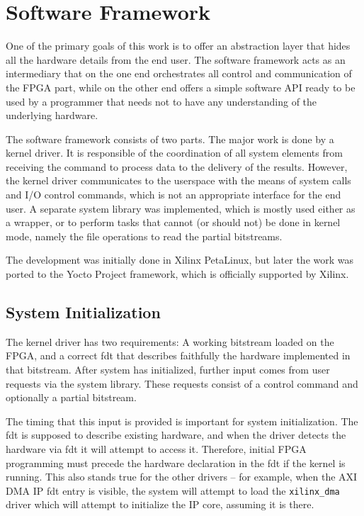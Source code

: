 \chapter{Software Framework}

One of the primary goals of this work is to offer an abstraction layer that hides
all the hardware details from the end user. The software framework acts as an intermediary
that on the one end orchestrates all control and communication of the FPGA part, while
on the other end offers a simple software API ready to be used by a programmer that needs not
to have any understanding of the underlying hardware.

The software framework consists of two parts. The major work is done by a kernel driver.
It is responsible of the coordination of all system elements from receiving the command
to process data to the delivery of the results. However, the kernel driver communicates
to the userspace with the means of system calls and I/O control commands, which is not
an appropriate interface for the end user. A separate system library was implemented,
which is mostly used either as a wrapper, or to perform tasks that cannot (or should not)
be done in kernel mode, namely the file operations to read the partial bitstreams.

The development was initially done in Xilinx PetaLinux, but later the work was
ported to the Yocto Project framework, which is officially supported by Xilinx.

\section{System Initialization}

The kernel driver has two requirements: A working bitstream loaded on the FPGA,
and a correct \gls{fdt} that describes faithfully the hardware implemented in that bitstream.
After system has initialized, further input comes from user requests via the system library.
These requests consist of a control command and optionally a partial bitstream.

The timing that this input is provided is important for system initialization.
The \gls{fdt} is supposed to describe existing hardware, 
and when the driver detects the hardware via \gls{fdt} it will attempt to access it.
Therefore, initial FPGA programming must precede the hardware declaration in the \gls{fdt}
if the kernel is running. This also stands true for the other drivers -- for example,
when the AXI DMA IP \gls{fdt} entry is visible, the system will attempt to load the \texttt{xilinx\_dma}
driver which will attempt to initialize the IP core, assuming it is there.

